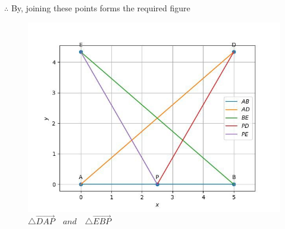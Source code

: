 \begin{enumerate}[label=\thesection.\arabic*.,ref=\thesection.\theenumi]
\begin{enumerate}[label=(\roman*)]
$\therefore$ By, joining these points forms the required figure

\end{enumerate}

\begin{figure}[H]
    \includegraphics[width=\columnwidth]{figs/triangle/fig_math_comp}
	\caption{$\triangle \vec{DAP} \hspace{12pt} and \hspace{12pt} \triangle \vec{EBP}$}
    \label{fig:fig2}
\end{figure}
\end{enumerate}
